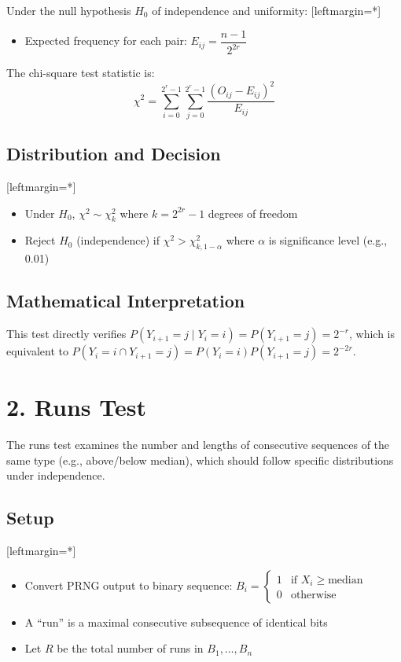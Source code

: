 \documentclass[12pt]{article}
\begin{document}
Under the null hypothesis $H_0$ of independence and uniformity:
[leftmargin=*] \begin{itemize}
    \item Expected frequency for each pair: $E_{ij} = \dfrac{n-1}{2^{2r}}$
\end{itemize}
The chi-square test statistic is:
\[
\chi^2 = \sum_{i=0}^{2^r-1} \sum_{j=0}^{2^r-1} \frac{(O_{ij} - E_{ij})^2}{E_{ij}}
\]

\subsection*{Distribution and Decision}
[leftmargin=*]\begin{itemize}
    \item Under $H_0$, $\chi^2 \sim \chi^2_{k}$ where $k = 2^{2r} - 1$ degrees of freedom
    \item Reject $H_0$ (independence) if $\chi^2 > \chi^2_{k,1-\alpha}$ where $\alpha$ is significance level (e.g., 0.01)
\end{itemize}
\subsection*{Mathematical Interpretation}
This test directly verifies $P(Y_{i+1} = j \mid Y_i = i) = P(Y_{i+1} = j) = 2^{-r}$, which is equivalent to $P(Y_i = i \cap Y_{i+1} = j) = P(Y_i = i)P(Y_{i+1} = j) = 2^{-2r}$.

\section*{2. Runs Test}

The runs test examines the number and lengths of consecutive sequences of the same type (e.g., above/below median), which should follow specific distributions under independence.

\subsection*{Setup}
[leftmargin=*]\begin{itemize}
    \item Convert PRNG output to binary sequence: $B_i = \begin{cases} 1 & \text{if } X_i \geq \text{median} \\ 0 & \text{otherwise} \end{cases}$
    \item A ``run'' is a maximal consecutive subsequence of identical bits
    \item Let $R$ be the total number of runs in $B_1, \dots, B_n$
\end{itemize}
\end{document}
